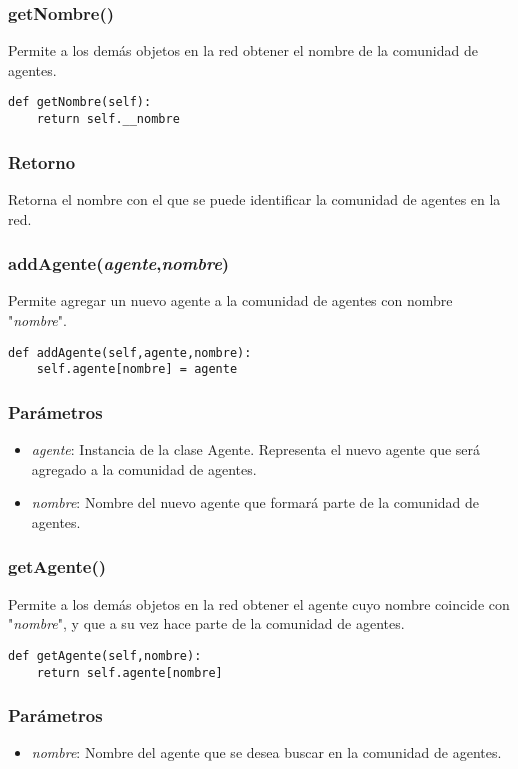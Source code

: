 \documentclass{article}
\begin{document}
\subsubsection{\textbf{getNombre}()}
Permite a los demás objetos en la red obtener el nombre de la comunidad de agentes.
\begin{lstlisting}
def getNombre(self):
    return self.__nombre
\end{lstlisting}
\subsubsection*{Retorno}
Retorna el nombre con el que se puede identificar la comunidad de agentes en la red.
\subsubsection{\textbf{addAgente}(\textit{agente},\textit{nombre})}
Permite agregar un nuevo agente a la comunidad de agentes con nombre "\textit{nombre}".
\begin{lstlisting}
def addAgente(self,agente,nombre):
	self.agente[nombre] = agente
\end{lstlisting}
\subsubsection*{Parámetros}
\begin{itemize}
\item \textit{agente}: Instancia de la clase Agente. Representa el nuevo agente que será agregado a la comunidad de agentes.
\item \textit{nombre}: Nombre del nuevo agente que formará parte de la comunidad de agentes.
\end{itemize}
\subsubsection{\textbf{getAgente}()}
Permite a los demás objetos en la red obtener el agente cuyo nombre coincide con "\textit{nombre}", y que a su vez hace parte de la comunidad de agentes.
\begin{lstlisting}
def getAgente(self,nombre):
    return self.agente[nombre]
\end{lstlisting}
\subsubsection*{Parámetros}
\begin{itemize}
\item \textit{nombre}: Nombre del agente que se desea buscar en la comunidad de agentes.
\end{itemize}
\end{document}
